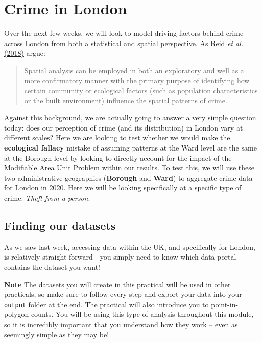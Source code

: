 \documentclass[
]{book}
\begin{document}
\hypertarget{crime-in-london}{%
\section{Crime in London}\label{crime-in-london}}

Over the next few weeks, we will look to model driving factors behind crime across London from both a statistical and spatial perspective. As \href{https://www.oxfordbibliographies.com/view/document/obo-9780195396607/obo-9780195396607-0123.xml}{Reid \emph{et al.} (2018)} argue:

\begin{quote}
Spatial analysis can be employed in both an exploratory and well as a more confirmatory manner with the primary purpose of identifying how certain community or ecological factors (such as population characteristics or the built environment) influence the spatial patterns of crime.
\end{quote}

Against this background, we are actually going to answer a very simple question today: does our perception of crime (and its distribution) in London vary at different scales? Here we are looking to test whether we would make the \textbf{ecological fallacy} mistake of assuming patterns at the Ward level are the same at the Borough level by looking to directly account for the impact of the Modifiable Area Unit Problem within our results. To test this, we will use these two administrative geographies (\textbf{Borough} and \textbf{Ward}) to aggregate crime data for London in 2020. Here we will be looking specifically at a specific type of crime: \emph{Theft from a person}.

\hypertarget{w03-finding}{%
\subsection{Finding our datasets}\label{w03-finding}}

As we saw last week, accessing data within the UK, and specifically for London, is relatively straight-forward - you simply need to know which data portal contains the dataset you want!

\textbf{Note}
The datasets you will create in this practical will be used in other practicals, so make sure to follow every step and export your data into your \texttt{output} folder at the end. The practical will also introduce you to point-in-polygon counts. You will be using this type of analysis throughout this module, so it is incredibly important that you understand how they work -- even as seemingly simple as they may be!
\end{document}
